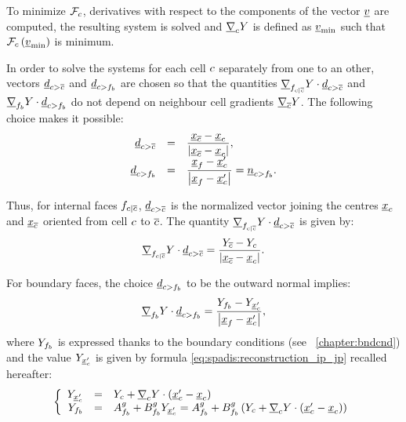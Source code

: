 To minimize $\mathcal{F}_{\celli}$, derivatives with respect to the components of the
vector $\variav  $ are computed, the resulting system is solved and $\grad_{\celli} \varia$ is defined
as $\variav_{\min}$ such that $\mathcal{F}_{\celli} \left( \variav_{\min}\right)$ is minimum.

In order to solve the systems for each cell $\celli$ separately from one to an other,
vectors $\vect{d}_{\bij}$ and $\vect{d}_\ib$ are chosen so that the quantities
$\grad_{\fij} \varia   \cdot \vect{d}_{\bij} $ and $\grad_{\fib} \varia   \cdot \vect{d}_\ib $
do not depend on neighbour cell gradients  $\grad_{\cellj} \varia $.
The following choice makes it possible:
\begin{equation}\label{eq:spadis:gradmc_scalar_d_choice}
\begin{array}{r c l}
\vect{d}_{\bij} &=& \dfrac{\centj - \centi}{\norm{\centj - \centi}}, \\
\vect{d}_\ib &=& \dfrac{\centf - \centip}{\norm{\centf - \centip}}= \vect{n}_\ib .
\end{array}
\end{equation}

Thus, for internal faces $\fij$, $\vect{d}_{\bij}$ is the normalized vector joining
the centres $\centi$ and $\centj$ oriented from cell $\celli$ to $\cellj$.
The quantity  $\grad_{\fij} \varia   \cdot \vect{d}_{\bij}$ is given by:
\begin{equation}
\grad_{\fij} \varia   \cdot \vect{d}_{\bij} =\dfrac{\varia_{\cellj} - \varia_{\celli} }{\norm{\centj - \centi}}.
\end{equation}

For boundary faces, the choice $\vect{d}_\ib$ to be the outward normal implies:
\begin{equation}
\grad_{\fib} \varia   \cdot \vect{d}_\ib =\dfrac{\varia_{\fib} - \varia_{\centip} }{\norm{\centf - \centip}},
\end{equation}
where $\varia_{\fib}$ is expressed thanks to the boundary conditions (see \chaptername~\ref{chapter:bndcnd}) and
the value $\varia_{\centip} $ is given by formula \eqref{eq:spadis:reconstruction_ip_jp} recalled hereafter:
%
\begin{equation}\label{eq:spadis:gradmc_bound_value}
\left\{\begin{array}{r c l}
\varia_{\centip} &=&\varia_{\celli} +\grad_{\celli} \varia \cdot \left(\centip - \centi\right)\\
\varia_{\fib} &=& A^g_{\fib} +B^g_{\fib} \varia_{\centip} = A^g_{\fib} +B^g_{\fib} \left( \varia_{\celli} +  \grad_{\celli} \varia \cdot \left(\centip - \centi\right) \right)
\end{array}\right.
\end{equation}

